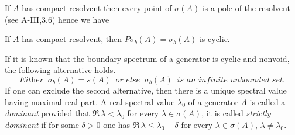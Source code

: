 If $A$ has compact resolvent then every point of $\sigma(A)$ is a pole of the resolvent (see A-III,3.6) hence we have
\begin{corollary}\label{cor:b3-2.10}
If $A$ has compact resolvent, then $P\sigma_{b}(A) = \sigma_{b}(A)$ is cyclic.
\end{corollary}
If it is known that the boundary spectrum of a generator is cyclic and nonvoid, the following alternative holds.
\begin{equation}\label{eq:b3-2.19}
\textit{Either } \ \sigma_{b}(A) = s(A) \ \textit{ or else } \ \sigma_{b}(A) \ \textit{ is an infinite unbounded set.}
\end{equation}
If one can exclude the second alternative, then there is a unique spectral value having maximal real part.
A real spectral value $\lambda_{0}$ of a generator $A$ is called a \emph{dominant} provided that $\Re\,\lambda  < \lambda_{0}$ for every $\lambda \in \sigma(A)$, it is called \emph{strictly dominant} if for some $\delta > 0$ one has $\Re\,\lambda  \leq \lambda_{0} - \delta$ for every $\lambda \in \sigma(A)$, $\lambda \neq \lambda_{0}$.

